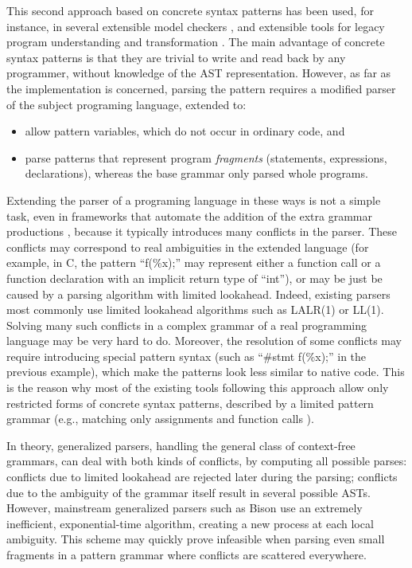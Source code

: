 This second approach based on concrete syntax patterns has been used,
for instance, in several extensible model checkers \cite{cecil, mc,
mj, blast}, and extensible tools for legacy program understanding and
transformation \cite{native, behavioral}. The main advantage of
concrete syntax patterns is that they are trivial to write and read
back by any programmer, without knowledge of the AST
representation. However, as far as the implementation is concerned,
parsing the pattern requires a modified parser of the subject
programing language, extended to:
\begin{itemize}
\item allow pattern variables, which do not occur in ordinary code, and
\item parse patterns that represent program {\em fragments}
(statements, expressions, declarations), whereas the base grammar only
parsed whole programs.
\end{itemize}
Extending the parser of a programing language in these ways is not a
simple task, even in frameworks that automate the addition of the
extra grammar productions \cite{refine}, because it typically
introduces many conflicts in the parser. These conflicts may
correspond to real ambiguities in the extended language (for example,
in C, the pattern ``f(\%x);'' may represent either a function call or
a function declaration with an implicit return type of ``int''), or
may be just be caused by a parsing algorithm with limited
lookahead. Indeed, existing parsers most commonly use limited
lookahead algorithms such as LALR(1) or LL(1). Solving many such
conflicts in a complex grammar of a real programming language may be
very hard to do. Moreover, the resolution of some conflicts may
require introducing special pattern syntax (such as ``\#stmt f(\%x);''
in the previous example), which make the patterns look less similar to
native code. This is the reason why most of the existing tools
following this approach allow only restricted forms of concrete syntax
patterns, described by a limited pattern grammar (e.g., matching only
assignments and function calls \cite{blast-ql}).

In theory, generalized parsers, handling the general class of
context-free grammars, can deal with both kinds of conflicts, by
computing all possible parses: conflicts due to limited lookahead are
rejected later during the parsing; conflicts due to the ambiguity of
the grammar itself result in several possible ASTs. However,
mainstream generalized parsers such as Bison \cite{bison} use an
extremely inefficient, exponential-time algorithm, creating a new
process at each local ambiguity. This scheme may quickly prove
infeasible when parsing even small fragments in a pattern grammar
where conflicts are scattered everywhere.

